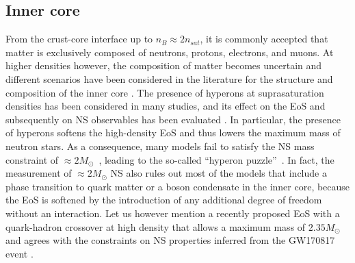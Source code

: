 \subsection{Inner core}\label{subsec:icore}

From the crust-core interface up to $n_B \approx 2n_{sat}$, it is commonly
accepted that matter is exclusively composed of neutrons, protons, electrons, 
and muons. At higher densities however, the composition of matter becomes
uncertain and different scenarios have been considered in the
literature for the structure and composition of the inner 
core \cite{Oertel2017}. The presence of hyperons at suprasaturation densities 
has been considered in many studies, and its effect on the EoS and 
subsequently on NS observables has been 
evaluated \cite{Bednarek2012,Fortin2015}. In particular, the 
presence of hyperons softens the high-density EoS and thus lowers the maximum 
mass of neutron stars. As a consequence, many models fail to satisfy the NS 
mass constraint of $\approx 2M_\odot$~\cite{Demorest2010,Antoniadis2013}, 
leading to the so-called ``hyperon puzzle''~\cite{Zdunik2013}. In fact, the 
measurement of $\approx 2M_\odot$ NS also rules out most of the models that 
include a phase transition to quark matter or a boson condensate in the inner 
core, because the EoS is softened
by the introduction of any additional degree of freedom without an 
interaction. Let us however mention a recently proposed EoS with a 
quark-hadron crossover at high density that allows a maximum mass of 
$2.35M_\odot$ \cite{Baym2019} and agrees with the constraints on NS
properties inferred from the GW170817 event \cite{GW1,GW2}.

